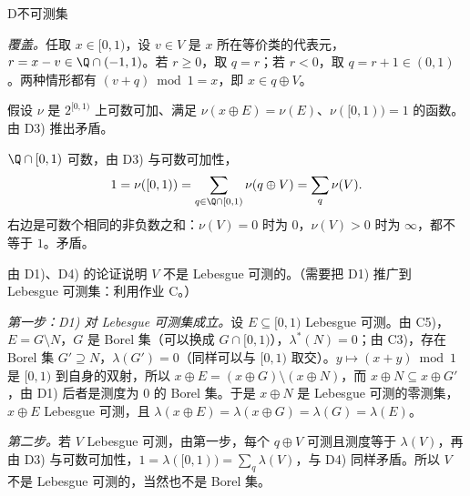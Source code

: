 \begin{probleme}{D}{不可测集}
\begin{questions}
\begin{solution}
\emph{覆盖。}任取 $x\in[0,1)$，设 $v\in V$ 是 $x$ 所在等价类的代表元，$r=x-v\in\Q\cap(-1,1)$。若 $r\geqslant0$，取 $q=r$；若 $r<0$，取 $q=r+1\in(0,1)$。两种情形都有 $(v+q)\bmod1=x$，即 $x\in q\oplus V$。
\end{solution}
\item 假设 $\nu$ 是 $2^{[0,1)}$ 上可数可加、满足 $\nu(x\oplus E)=\nu(E)$、$\nu([0,1))=1$ 的函数。由 D3) 推出矛盾。
\begin{solution}
$\Q\cap[0,1)$ 可数，由 D3) 与可数可加性，
\[
1=\nu([0,1))=\sum_{q\in\Q\cap[0,1)}\nu(q\oplus V)=\sum_{q}\nu(V).
\]
右边是可数个相同的非负数之和：$\nu(V)=0$ 时为 $0$，$\nu(V)>0$ 时为 $\infty$，都不等于 $1$。矛盾。
\end{solution}
\item 由 D1)、D4) 的论证说明 $V$ 不是 Lebesgue 可测的。（需要把 D1) 推广到 Lebesgue 可测集：利用作业 C。）
\begin{solution}
\emph{第一步：D1) 对 Lebesgue 可测集成立。}设 $E\subseteq[0,1)$ Lebesgue 可测。由 C5)，$E=G\setminus N$，$G$ 是 Borel 集（可以换成 $G\cap[0,1)$），$\lambda^*(N)=0$；由 C3)，存在 Borel 集 $G'\supseteq N$，$\lambda(G')=0$（同样可以与 $[0,1)$ 取交）。$y\mapsto(x+y)\bmod1$ 是 $[0,1)$ 到自身的双射，所以 $x\oplus E=(x\oplus G)\setminus(x\oplus N)$，而 $x\oplus N\subseteq x\oplus G'$，由 D1) 后者是测度为 $0$ 的 Borel 集。于是 $x\oplus N$ 是 Lebesgue 可测的零测集，$x\oplus E$ Lebesgue 可测，且 $\lambda(x\oplus E)=\lambda(x\oplus G)=\lambda(G)=\lambda(E)$。

\emph{第二步。}若 $V$ Lebesgue 可测，由第一步，每个 $q\oplus V$ 可测且测度等于 $\lambda(V)$，再由 D3) 与可数可加性，$1=\lambda([0,1))=\sum_q\lambda(V)$，与 D4) 同样矛盾。所以 $V$ 不是 Lebesgue 可测的，当然也不是 Borel 集。
\end{solution}
\end{questions}
\end{probleme}

\thinkingpart

